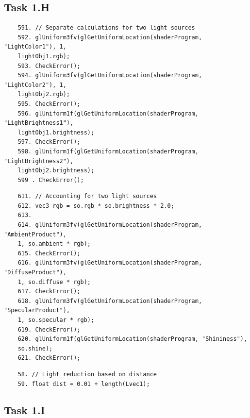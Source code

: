 \documentclass{article}
\begin{document}
\newpage

\subsection{Task 1.H}\label{sec:1H}


\begin{commandline}
	\begin{verbatim}
	591. // Separate calculations for two light sources
	592. glUniform3fv(glGetUniformLocation(shaderProgram, "LightColor1"), 1,
	lightObj1.rgb);
	593. CheckError();
	594. glUniform3fv(glGetUniformLocation(shaderProgram, "LightColor2"), 1,
	lightObj2.rgb);
	595. CheckError();
	596. glUniform1f(glGetUniformLocation(shaderProgram, "LightBrightness1"),
	lightObj1.brightness);
	597. CheckError();
	598. glUniform1f(glGetUniformLocation(shaderProgram, "LightBrightness2"),
	lightObj2.brightness);
	599	. CheckError();
	\end{verbatim}
\end{commandline}

\begin{commandline}
	\begin{verbatim}
	611. // Accounting for two light sources
	612. vec3 rgb = so.rgb * so.brightness * 2.0;
	613. 
	614. glUniform3fv(glGetUniformLocation(shaderProgram, "AmbientProduct"),
	1, so.ambient * rgb);
	615. CheckError();
	616. glUniform3fv(glGetUniformLocation(shaderProgram, "DiffuseProduct"),
	1, so.diffuse * rgb);
	617. CheckError();        
	618. glUniform3fv(glGetUniformLocation(shaderProgram, "SpecularProduct"),
	1, so.specular * rgb);
	619. CheckError();        
	620. glUniform1f(glGetUniformLocation(shaderProgram, "Shininess"),
	so.shine);
	621. CheckError();
	\end{verbatim}
\end{commandline}

\begin{commandlineF}
	\begin{verbatim}
	58. // Light reduction based on distance
	59. float dist = 0.01 + length(Lvec1);
	\end{verbatim}
\end{commandlineF}

\newpage

\subsection{Task 1.I}\label{sec:1I}
\end{document}
